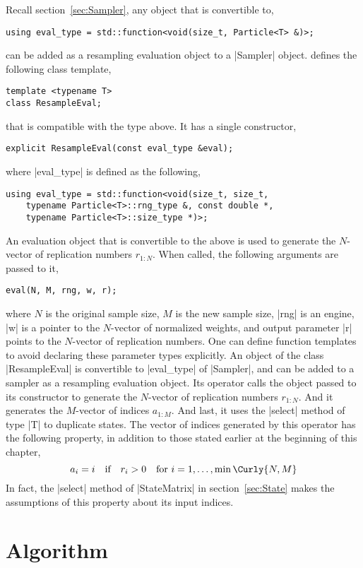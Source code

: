 Recall section~\ref{sec:Sampler}, any object that is convertible to,
\begin{verbatim}
using eval_type = std::function<void(size_t, Particle<T> &)>;
\end{verbatim}
can be added as a resampling evaluation object to a |Sampler| object. \mckl
defines the following class template,
\begin{verbatim}
template <typename T>
class ResampleEval;
\end{verbatim}
that is compatible with the type above. It has a single constructor,
\begin{verbatim}
explicit ResampleEval(const eval_type &eval);
\end{verbatim}
where |eval_type| is defined as the following,
\begin{verbatim}
using eval_type = std::function<void(size_t, size_t,
    typename Particle<T>::rng_type &, const double *,
    typename Particle<T>::size_type *)>;
\end{verbatim}
An evaluation object that is convertible to the above is used to generate the
$N$-vector of replication numbers $r_{1:N}$. When called, the following
arguments are passed to it,
\begin{verbatim}
eval(N, M, rng, w, r);
\end{verbatim}
where $N$ is the original sample size, $M$ is the new sample size, |rng| is an
\rng engine, |w| is a pointer to the $N$-vector of normalized weights, and
output parameter |r| points to the $N$-vector of replication numbers. One can
define function templates to avoid declaring these parameter types explicitly.
An object of the class |ResampleEval| is convertible to |eval_type| of
|Sampler|, and can be added to a sampler as a resampling evaluation object. Its
operator calls the object passed to its constructor to generate the $N$-vector
of replication numbers $r_{1:N}$. And it generates the $M$-vector of indices
$a_{1:M}$. And last, it uses the |select| method of type |T| to duplicate
states. The vector of indices generated by this operator has the following
property, in addition to those stated earlier at the beginning of this chapter,
\begin{equation*}
  a_i = i \quad \text{if} \quad  r_i > 0 \quad
  \text{for } i = 1,\dots,\min\Curly{N, M}
\end{equation*}
In fact, the |select| method of |StateMatrix| in section~\ref{sec:State} makes
the assumptions of this property about its input indices.

\section{Algorithm}
\label{sec:Algorithm (Resample)}

